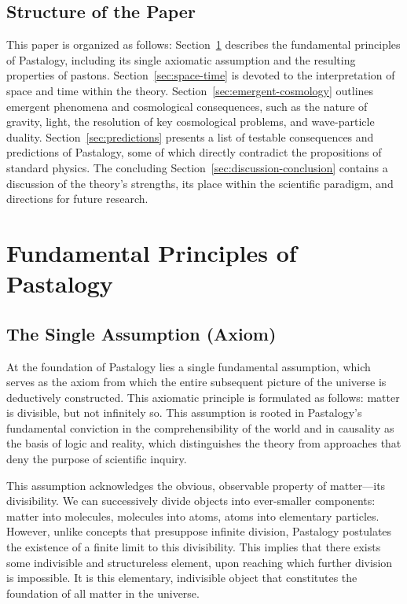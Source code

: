 \documentclass[pdflatex,sn-mathphys-num,referee]{sn-jnl}
\begin{document}
\subsection{Structure of the Paper}\label{subsec:structure}

This paper is organized as follows: Section~\ref{sec:fundamentals} describes the fundamental principles of Pastalogy, including its single axiomatic assumption and the resulting properties of pastons. Section~\ref{sec:space-time} is devoted to the interpretation of space and time within the theory. Section~\ref{sec:emergent-cosmology} outlines emergent phenomena and cosmological consequences, such as the nature of gravity, light, the resolution of key cosmological problems, and wave-particle duality. Section~\ref{sec:predictions} presents a list of testable consequences and predictions of Pastalogy, some of which directly contradict the propositions of standard physics. The concluding Section~\ref{sec:discussion-conclusion} contains a discussion of the theory's strengths, its place within the scientific paradigm, and directions for future research.

\section{Fundamental Principles of Pastalogy}\label{sec:fundamentals}

\subsection{The Single Assumption (Axiom)}\label{subsec:axiom}

At the foundation of Pastalogy lies a single fundamental assumption, which serves as the axiom from which the entire subsequent picture of the universe is deductively constructed. This axiomatic principle is formulated as follows: matter is divisible, but not infinitely so. This assumption is rooted in Pastalogy's fundamental conviction in the comprehensibility of the world and in causality as the basis of logic and reality, which distinguishes the theory from approaches that deny the purpose of scientific inquiry.

This assumption acknowledges the obvious, observable property of matter---its divisibility. We can successively divide objects into ever-smaller components: matter into molecules, molecules into atoms, atoms into elementary particles. However, unlike concepts that presuppose infinite division, Pastalogy postulates the existence of a finite limit to this divisibility. This implies that there exists some indivisible and structureless element, upon reaching which further division is impossible. It is this elementary, indivisible object that constitutes the foundation of all matter in the universe.
\end{document}
